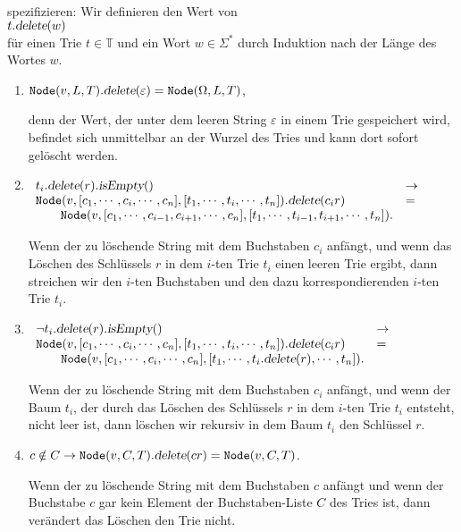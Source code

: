 \\[0.2cm]
spezifizieren:  Wir definieren den Wert von \\[0.2cm]
\hspace*{1.3cm} 
$t.\textsl{delete}(w)$
\\[0.2cm]
f\"ur einen Trie $t \in \mathbb{T}$ und ein Wort $w \in \Sigma^*$
durch Induktion nach der L\"ange des Wortes $w$.
\begin{enumerate}
\item $\texttt{Node}(v,L,T).\textsl{delete}(\varepsilon) = \texttt{Node}(\Omega,L,T)$,

      denn der Wert, der unter dem leeren String $\varepsilon$ in einem Trie
      gespeichert wird, befindet sich unmittelbar an der Wurzel des Tries und
      kann dort sofort gel\"oscht werden.
\item $\begin{array}[t]{ll}
       t_i.\textsl{delete}(r).\textsl{isEmpty}()   & \rightarrow \\
       \texttt{Node}(v, [c_1,\cdots,c_i,\cdots,c_n],[t_1,\cdots,t_i,\cdots,t_n]).\textsl{delete}(c_ir) 
       & = \\
       \qquad 
       \texttt{Node}(v, [c_1,\cdots,c_{i-1},c_{i+1},\cdots,c_n],[t_1,\cdots,t_{i-1},t_{i+1},\cdots,t_n]).
       \end{array}
       $

       Wenn der zu l\"oschende String mit dem Buchstaben $c_i$ anf\"angt, und wenn
       das L\"oschen des Schl\"ussels $r$ in dem $i$-ten Trie $t_i$ einen leeren
       Trie ergibt, dann streichen wir den $i$-ten Buchstaben und den dazu
       korrespondierenden $i$-ten Trie $t_i$.
\item $\begin{array}[t]{ll}
       \neg t_i.\textsl{delete}(r).\textsl{isEmpty}()   & \rightarrow \\
       \texttt{Node}(v, [c_1,\cdots,c_i,\cdots,c_n],[t_1,\cdots,t_i,\cdots,t_n]).\textsl{delete}(c_ir) 
       & = \\
       \qquad \texttt{Node}(v, [c_1,\cdots,c_i,\cdots,c_n],[t_1,\cdots,t_i.\textsl{delete}(r),\cdots,t_n]).
       \end{array}
       $

       Wenn der zu l\"oschende String mit dem Buchstaben $c_i$ anf\"angt, und wenn
       der Baum $t_i$, der durch das  L\"oschen des Schl\"ussels $r$ in dem $i$-ten
       Trie $t_i$ entsteht, nicht leer ist, dann l\"oschen wir rekursiv in dem Baum $t_i$ den Schl\"ussel
       $r$.
\item $c \notin C \rightarrow \texttt{Node}(v, C, T).\textsl{delete}(cr) =
       \texttt{Node}(v, C, T)$. 

       Wenn der zu l\"oschende String mit dem Buchstaben $c$ anf\"angt und wenn der
       Buchstabe $c$ gar kein Element der Buchstaben-Liste $C$ des Tries
       ist, dann ver\"andert das L\"oschen den Trie nicht.
\end{enumerate}

